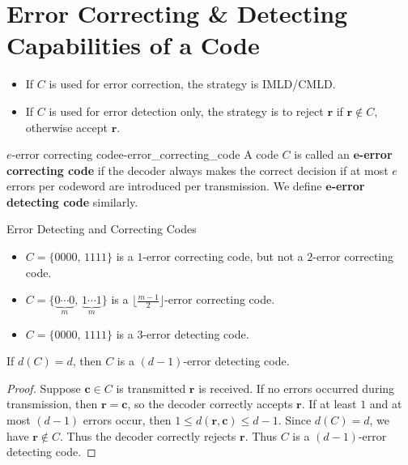 
\section{Error Correcting \& Detecting Capabilities of a Code}
\begin{itemize}
    \item If $ C $ is used for error correction, the strategy is IMLD/CMLD\@.
    \item If $ C $ is used for error detection only, the strategy is
          to reject $ \bm{r} $ if $ \bm{r}\notin C $, otherwise accept $ \bm{r} $.
\end{itemize}

\begin{Definition}{$ e $-error correcting code}{e-error_correcting_code}
    A code $ C $ is called an \textbf{$\bm{e}$-error correcting code}
    if the decoder always makes the correct decision if
    at most $ e $ errors per codeword are introduced per transmission.
    We define \textbf{$\bm{e}$-error detecting code} similarly.
\end{Definition}

\begin{Example}{Error Detecting and Correcting Codes}{}
    \begin{itemize}
        \item $ C=\{0000,\,1111\} $ is a $ 1 $-error correcting code, but not a
              $ 2 $-error correcting code.
        \item $ C=\{\underbrace{0\cdots 0}_{m},\,\underbrace{1\cdots 1}_{m}\} $
              is a $ \bigl\lfloor \frac{m-1}{2} \bigr\rfloor $-error correcting code.
        \item $ C=\{0000,\,1111\} $ is a $ 3 $-error detecting code.
    \end{itemize}
\end{Example}

\begin{Theorem}{}{}
    If $ d(C)=d $, then $ C $ is a $ (d-1) $-error detecting code.
\end{Theorem}

\begin{proof}
    Suppose $ \bm{c}\in C $ is transmitted $ \bm{r} $ is received. If no
    errors occurred during transmission, then $ \bm{r}=\bm{c} $,
    so the decoder correctly accepts $ \bm{r} $. If at least $ 1 $
    and at most $ (d-1) $ errors occur, then
    $ 1\leqslant d(\bm{r},\bm{c})\leqslant d-1 $. Since $ d(C)=d $,
    we have $ \bm{r}\notin C $. Thus the decoder correctly rejects
    $ \bm{r} $. Thus $ C $ is a $ (d-1) $-error detecting code.
\end{proof}

